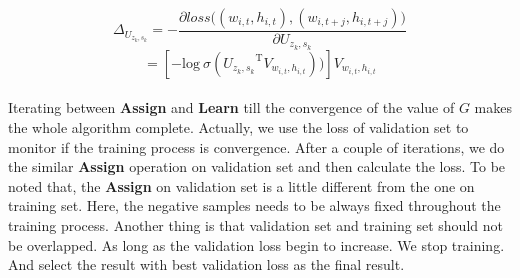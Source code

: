 $$\Delta_{U_{z_k,s_k}} = -\frac{\partial loss\big ( (w_{i,t},h_{i,t}),(w_{i,t+j},h_{i,t+j})\big )}{\partial U_{z_k,s_k}}$$
$$=[-\mathrm{log}\ \sigma({U_{z_k,s_k}}^{\mathrm{T}}V_{w_{i,t},h_{i,t}}))]V_{w_{i,t},h_{i,t}}$$


\paragraph{}
Iterating between \textbf{Assign} and \textbf{Learn} till the convergence of the value of $G$ makes the whole algorithm complete. Actually, we use the loss of validation set to monitor if the training process is convergence. After a couple of iterations, we do the similar \textbf{Assign} operation on validation set and then calculate the loss. To be noted that, the \textbf{Assign} on validation set is a little different from the one on training set. Here, the negative samples needs to be always fixed throughout the training process. Another thing is that validation set and training set should not be overlapped. As long as the validation loss begin to increase.  We stop training. And select the result with best validation loss as the final result. 

